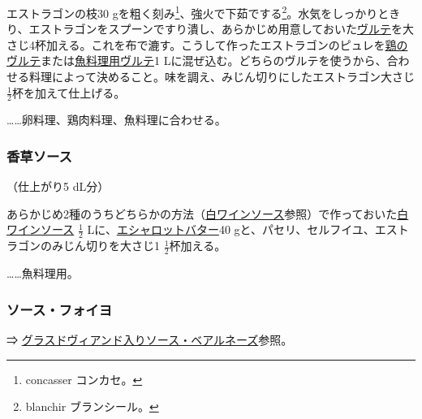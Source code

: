 \begin{recette}
エストラゴンの枝30 gを粗く刻み\footnote{concasser コンカセ。}、強火で下茹でする\footnote{blanchir
  ブランシール。}。水気をしっかりときり、エストラゴンをスプーンですり潰し、あらかじめ用意しておいた\protect\hyperlink{veloute}{ヴルテ}を大さじ4杯加える。これを布で漉す。こうして作ったエストラゴンのピュレを\protect\hyperlink{veloute-de-volaille}{鶏のヴルテ}または\protect\hyperlink{veloute-de-poisson}{魚料理用ヴルテ}1
Lに混ぜ込む。どちらのヴルテを使うから、合わせる料理によって決めること。味を調え、みじん切りにしたエストラゴン大さじ
\(\frac{1}{2}\)杯を加えて仕上げる。

\ldots{}\ldots{}卵料理、鶏肉料理、魚料理に合わせる。

\atoaki{}

\hypertarget{sauce-aux-fines-herbes-blanche}{%
\subsubsection{香草ソース}\label{sauce-aux-fines-herbes-blanche}}



（仕上がり5 dL分）

あらかじめ2種のうちどちらかの方法（\protect\hyperlink{sauce-vin-blanc}{白ワインソース}参照）で作っておいた\protect\hyperlink{sauce-vin-blanc}{白ワインソース}
\(\frac{1}{2}\)
Lに、\protect\hyperlink{beurre-d-echalote}{エシャロットバター}40
gと、パセリ、セルフイユ、エストラゴンのみじん切りを大さじ1
\(\frac{1}{2}\)杯加える。

\ldots{}\ldots{}魚料理用。

\atoaki{}

\hypertarget{sauce-foyot}{%
\subsubsection{ソース・フォイヨ}\label{sauce-foyot}}


⇒
\protect\hyperlink{sauce-bearnaise-glace-de-viande}{グラスドヴィアンド入りソース・ベアルネーズ}参照。


\end{recette}
